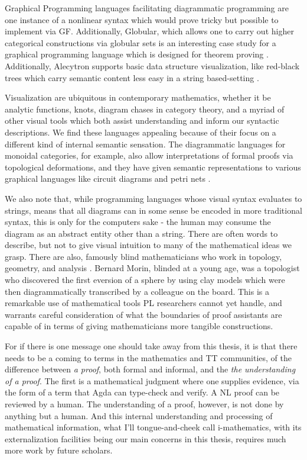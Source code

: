 Graphical Programming languages facilitating diagrammatic programming are one
instance of a nonlinear syntax which would prove tricky but possible to
implement via GF.  Additionally, Globular, which allows one to
carry out higher categorical constructions via globular sets is an interesting
case study for a graphical programming language which is designed for 
theorem proving \cite{Bar2016GlobularAO}.
Additionally, Alecytron  supports basic data structure
visualization, like red-black trees which carry semantic content less easy in a
string based-setting \cite{coqAlec}.

Visualization are ubiquitous in contemporary mathematics, whether it be
analytic functions, knots, diagram chases in category theory, and a myriad of
other visual tools which both assist understanding and inform our syntactic
descriptions. We find these languages appealing because of their focus on a different kind of
internal semantic sensation. The diagrammatic languages for monoidal categories, for example, also allow
interpretations of formal proofs via topological deformations, and they have
given semantic representations to various graphical languages like circuit
diagrams and petri nets \cite{fong2016algebra}.

We also note that, while programming languages whose visual syntax evaluates to
strings, means that all diagrams can in some sense be encoded in more
traditional syntax, this is only for the computers sake - the human may consume
the diagram as an abstract entity other than a string. There are often words to
describe, but not to give visual intuition to many of the mathematical ideas we
grasp. There are also, famously blind mathematicians who work in topology,
geometry, and analysis \cite{2002TheWO}. Bernard Morin, blinded at a young age,
was a topologist who discovered the first eversion of a sphere by using clay
models which were then diagrammatically transcribed by a colleague on the board.
This is a remarkable use of mathematical tools PL researchers cannot  yet
handle, and warrants careful consideration of what the
boundaries of proof assistants are capable of in terms of giving mathematicians
more tangible constructions.

For if there is one message one should take away from this thesis, it is that
there needs to be a coming to terms in the mathematics and TT communities, of
the difference between \emph{a proof}, both formal and informal, and the
\emph{the understanding of a proof}. The first is a mathematical judgment where
one supplies evidence, via the form of a term that Agda can type-check and
verify. A NL proof can be reviewed by a human. The understanding of a proof,
however, is not done by anything but a human. And this internal understanding
and processing of mathematical information, what I'll tongue-and-cheek call
i-mathematics, with its externalization facilities being our main concerns in
this thesis, requires much more work by future scholars.